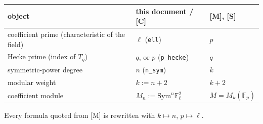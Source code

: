\documentclass[11pt]{article}
\theoremstyle{remark}
\newcommand{\F}{\mathbb{F}}
\newcommand{\Sym}{\mathrm{Sym}}
\newcommand{\Fl}{\F_\ell}
\newcommand{\Mn}{M_n}
\begin{document}
\begin{center}
\begin{tabular}{@{}lll@{}}
\toprule
object & this document / [C] & [M], [S] \\
\midrule
coefficient prime (characteristic of the field) & $\ell$ (\texttt{ell}) & $p$ \\
Hecke prime (index of $T_q$) & $q$, or $p$ (\texttt{p\_hecke}) & $q$ \\
symmetric-power degree & $n$ (\texttt{n\_sym}) & $k$ \\
modular weight & $k:=n+2$ & $k+2$ \\
coefficient module & $\Mn:=\Sym^n\Fl^2$ & $M=M_k(\F_p)$ \\
\bottomrule
\end{tabular}
\end{center}

\noindent Every formula quoted from [M] is rewritten with $k\mapsto n$, $p\mapsto\ell$.
\end{document}
